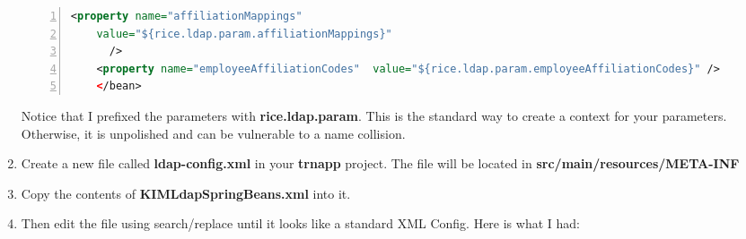 \begin{enumerate}
\begin{lstlisting}[numbers=left,language=xml,basicstyle=\scriptsize,backgroundcolor=\color{ubergray},caption={trnapp/src/main/resources/KIMLdapSpringBeans.xml},frame=single,breaklines=true]
  	<property name="affiliationMappings"
    value="${rice.ldap.param.affiliationMappings}"
      />
  	<property name="employeeAffiliationCodes"  value="${rice.ldap.param.employeeAffiliationCodes}" />
	</bean>
\end{lstlisting}
Notice that I prefixed the parameters with
\textbf{rice.ldap.param}. This is the standard way to create a context
for your parameters. Otherwise, it is unpolished and can be vulnerable
to a name collision.
\item Create a new file called \textbf{ldap-config.xml} in your
  \textbf{trnapp} project. The file will be located in
  \textbf{src/main/resources/META-INF}
  \item Copy the contents of \textbf{KIMLdapSpringBeans.xml} into it.
  \item Then edit the file using search/replace until it looks like a
    standard XML Config. Here is what I had:


\end{enumerate}
